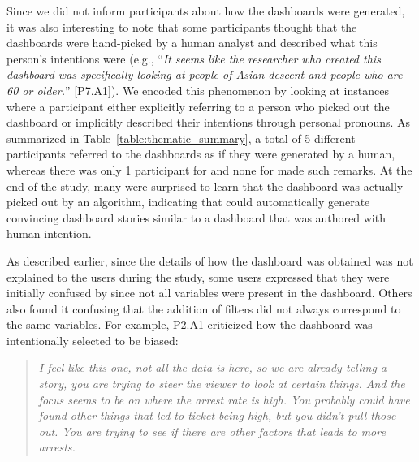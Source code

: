 \par Since we did not inform participants about how the dashboards were generated, it was also interesting to note that some participants thought that the dashboards were hand-picked by a human analyst and described what this person's intentions were (e.g., ``\textit{It seems like the researcher who created this dashboard was specifically looking at people of Asian descent and people who are 60 or older.}'' [P7.A1]). We encoded this phenomenon by looking at instances where a participant either explicitly referring to a person who picked out the dashboard or implicitly described their intentions through personal pronouns. As summarized in Table~\ref{table:thematic_summary}, a total of 5 different participants referred to the \system dashboards as if they were generated by a human, whereas there was only 1 participant for \cluster and none for \BFS made such remarks. At the end of the study, many were surprised to learn that the \system dashboard was actually picked out by an algorithm, indicating that \system could automatically generate convincing dashboard stories similar to a dashboard that was authored with human intention.
\par As described earlier, since the details of how the dashboard was obtained was not explained to the users during the study, some users expressed that they were initially confused by \system since not all variables were present in the dashboard. Others also found it confusing that the addition of filters did not always correspond to the same variables. For example, P2.A1 criticized how the dashboard was intentionally selected to be biased:
\begin{quote}
\textit{I feel like this one, not all the data is here, so we are already telling a story, you are trying to steer the viewer to look at certain things. And the focus seems to be on where the arrest rate is high. You probably could have found other things that led to ticket being high, but you didn't pull those out. You are trying to see if there are other factors that leads to more arrests.}
\end{quote}
